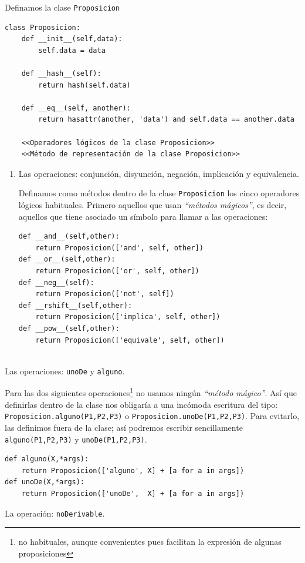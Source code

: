 \documentclass[10pt,a4paper]{report}
\begin{document}
Definamos la clase \texttt{Proposicion}
\begin{verbatim}
class Proposicion:
    def __init__(self,data):
        self.data = data
        
    def __hash__(self):
        return hash(self.data)
    
    def __eq__(self, another):
        return hasattr(another, 'data') and self.data == another.data

    <<Operadores lógicos de la clase Proposicion>>
    <<Método de representación de la clase Proposicion>>    
\end{verbatim}
\begin{enumerate}
\item Las operaciones: conjunción, disyunción, negación, implicación y equivalencia.
\label{sec:orge1e7694}

Definamos como métodos dentro de la clase \texttt{Proposicion} los cinco operadores lógicos habituales. 
Primero aquellos que usan \emph{``métodos mágicos''}, es decir, aquellos que tiene asociado un símbolo para llamar a las operaciones:
\begin{verbatim}
def __and__(self,other):
    return Proposicion(['and', self, other])
def __or__(self,other):
    return Proposicion(['or', self, other])
def __neg__(self):
    return Proposicion(['not', self])
def __rshift__(self,other):
    return Proposicion(['implica', self, other])
def __pow__(self,other):
    return Proposicion(['equivale', self, other])
    
\end{verbatim}
\end{enumerate}
\item Las operaciones: \texttt{unoDe} y \texttt{alguno}.
\label{sec:orgdc98711}

Para las dos siguientes operaciones\footnote{no habituales, aunque convenientes pues facilitan la expresión de algunas proposiciones} no usamos ningún \emph{``método mágico''}. 
Así que definirlas dentro de la clase nos obligaría a una incómoda escritura del tipo: \texttt{Proposicion.alguno(P1,P2,P3)} o \texttt{Proposicion.unoDe(P1,P2,P3)}.
Para evitarlo, las definimos fuera de la clase; así podremos escribir sencillamente \texttt{alguno(P1,P2,P3)} y \texttt{unoDe(P1,P2,P3)}.
\begin{verbatim}
def alguno(X,*args):
    return Proposicion(['alguno', X] + [a for a in args])
def unoDe(X,*args):
    return Proposicion(['unoDe',  X] + [a for a in args])

\end{verbatim}
\item La operación: \texttt{noDerivable}.
\label{sec:orgd6741c9}
\end{document}
